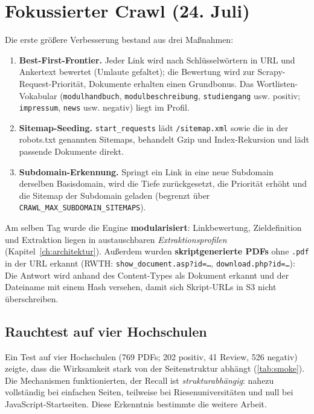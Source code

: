 \section{Fokussierter Crawl (24. Juli)}
Die erste größere Verbesserung bestand aus drei Maßnahmen:
\begin{enumerate}
  \item \textbf{Best-First-Frontier.} Jeder Link wird nach Schlüsselwörtern in URL und Ankertext bewertet (Umlaute gefaltet); die Bewertung wird zur Scrapy-Request-Priorität, Dokumente erhalten einen Grundbonus. Das Wortlisten-Vokabular (\texttt{modulhandbuch}, \texttt{modulbeschreibung}, \texttt{studiengang} usw. positiv; \texttt{impressum}, \texttt{news} usw. negativ) liegt im Profil.
  \item \textbf{Sitemap-Seeding.} \texttt{start\_requests} lädt \texttt{/sitemap.xml} sowie die in der robots.txt genannten Sitemaps, behandelt Gzip und Index-Rekursion und lädt passende Dokumente direkt.
  \item \textbf{Subdomain-Erkennung.} Springt ein Link in eine neue Subdomain derselben Basisdomain, wird die Tiefe zurückgesetzt, die Priorität erhöht und die Sitemap der Subdomain geladen (begrenzt über \texttt{CRAWL\_MAX\_SUBDOMAIN\_SITEMAPS}).
\end{enumerate}
Am selben Tag wurde die Engine \textbf{modularisiert}: Linkbewertung, Zieldefinition und Extraktion liegen in austauschbaren \emph{Extraktionsprofilen} (Kapitel~\ref{ch:architektur}). Außerdem wurden \textbf{skriptgenerierte PDFs} ohne \texttt{.pdf} in der URL erkannt (RWTH: \texttt{show\_document.asp?id=…}, \texttt{download.php?id=…}): Die Antwort wird anhand des Content-Types als Dokument erkannt und der Dateiname mit einem Hash versehen, damit sich Skript-URLs in S3 nicht überschreiben.

\subsection{Rauchtest auf vier Hochschulen}
Ein Test auf vier Hochschulen (769 PDFs; 202 positiv, 41 Review, 526 negativ) zeigte, dass die Wirksamkeit stark von der Seitenstruktur abhängt (\cref{tab:smoke}). Die Mechanismen funktionierten, der Recall ist \emph{strukturabhängig}: nahezu vollständig bei einfachen Seiten, teilweise bei Riesenuniversitäten und null bei JavaScript-Startseiten. Diese Erkenntnis bestimmte die weitere Arbeit.

